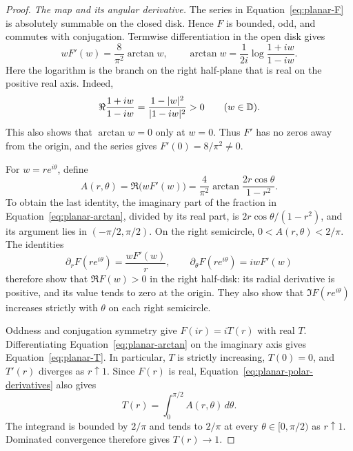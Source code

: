 \begin{proof}
\noindent\textit{The map and its angular derivative.}
The series in Equation~\eqref{eq:planar-F} is absolutely summable on the
closed disk.  Hence \(F\) is bounded, odd, and commutes with conjugation.
Termwise differentiation in the open disk gives
\begin{equation}\label{eq:planar-arctan}
 wF'(w)=\frac{8}{\pi^2}\arctan w,
 \qquad
 \arctan w=\frac{1}{2i}\log\frac{1+iw}{1-iw}.
\end{equation}
Here the logarithm is the branch on the right half-plane that is real on
the positive real axis.  Indeed,
\[
 \Re\frac{1+iw}{1-iw}
   =\frac{1-|w|^2}{|1-iw|^2}>0
 \qquad (w\in\mathbb D).
\]
This also shows that \(\arctan w=0\) only at \(w=0\).
Thus \(F'\) has no zeros away from the origin, and the series gives
\(F'(0)=8/\pi^2\ne0\).

For \(w=re^{i\theta}\), define
\begin{equation}\label{eq:planar-A}
 A(r,\theta)=\Re\bigl(wF'(w)\bigr)
   =\frac{4}{\pi^2}
       \arctan\frac{2r\cos\theta}{1-r^2}.
\end{equation}
To obtain the last identity, the imaginary part of the fraction in
Equation~\eqref{eq:planar-arctan}, divided by its real part, is
\(2r\cos\theta/(1-r^2)\), and its argument lies in
\((-\pi/2,\pi/2)\).  On the right semicircle,
\(0<A(r,\theta)<2/\pi\).  The identities
\begin{equation}\label{eq:planar-polar-derivatives}
 \partial_r F(re^{i\theta})=\frac{wF'(w)}{r},
 \qquad
 \partial_\theta F(re^{i\theta})=iwF'(w)
\end{equation}
therefore show that \(\Re F(w)>0\) in the right half-disk: its radial
derivative is positive, and its value tends to zero at the origin.
They also show that \(\Im F(re^{i\theta})\) increases strictly with
\(\theta\) on each right semicircle.

Oddness and conjugation symmetry give \(F(ir)=iT(r)\) with real \(T\).
Differentiating Equation~\eqref{eq:planar-arctan} on the imaginary axis
gives Equation~\eqref{eq:planar-T}.  In particular, \(T\) is strictly
increasing, \(T(0)=0\), and \(T'(r)\) diverges as \(r\uparrow1\).
Since \(F(r)\) is real, Equation~\eqref{eq:planar-polar-derivatives}
also gives
\[
 T(r)=\int_0^{\pi/2}A(r,\theta)\,d\theta.
\]
The integrand is bounded by \(2/\pi\) and tends to \(2/\pi\) at every
\(\theta\in[0,\pi/2)\) as \(r\uparrow1\).  Dominated convergence
therefore gives \(T(r)\to1\).


\end{proof}
